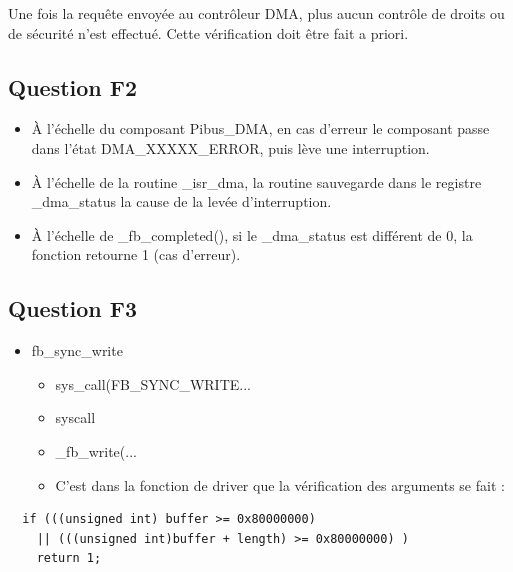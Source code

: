 \documentclass[10pt]{article}
\begin{document}
Une fois la requête envoyée au contrôleur DMA, plus aucun contrôle de droits ou
de sécurité n'est effectué. Cette vérification doit être fait a priori.

\subsection{Question F2}
\begin{itemize}
  \item À l'échelle du composant Pibus\_DMA, en cas d'erreur le composant passe
  dans l'état DMA\_XXXXX\_ERROR, puis lève une interruption.
  \item À l'échelle de la routine \_isr\_dma, la routine sauvegarde dans le
  registre \_dma\_status la cause de la levée d'interruption.
  \item À l'échelle de \_fb\_completed(), si le \_dma\_status est différent de
  0, la fonction retourne 1 (cas d'erreur).
\end{itemize}

\subsection{Question F3}
\begin{itemize}
  \item fb\_sync\_write
  \begin{itemize}
    \item sys\_call(FB\_SYNC\_WRITE...
    \item syscall
    \item \_fb\_write(...
    \item C'est dans la fonction de driver que la vérification des
    arguments se fait :\\
  \end{itemize}
\end{itemize}
\begin{lstlisting}
  if (((unsigned int) buffer >= 0x80000000)
    || (((unsigned int)buffer + length) >= 0x80000000) )
    return 1;
\end{lstlisting}

\newpage


\end{document}
